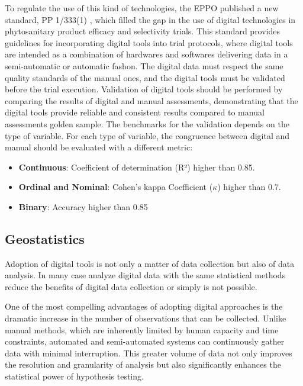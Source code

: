 \documentclass[12pt,a4paper,oneside]{report}
\begin{document}
To regulate the use of this kind of technologies, the EPPO published a new standard, 
PP 1/333(1) \cite{PP13332024}, which 
filled the gap in the use of digital technologies in phytosanitary product efficacy
and selectivity trials. This standard provides guidelines for incorporating digital
tools into trial protocols, where digital tools are intended as a combination of
hardwares and softwares delivering data 
in a semi-automatic or automatic fashon.
The digital data must respect the same quality standards of the manual
ones, and the digital tools must be validated before the trial execution.
Validation of digital tools should
be performed by comparing the results of digital and manual assessments, 
demonstrating that the digital tools provide reliable and consistent
results compared to manual assessments golden sample. 
The benchmarks for the validation depends
on the type of variable. For each type of variable, the congruence between 
digital and manual should be evaluated with a different metric:

\begin{itemize}
    \item \textbf{Continuous}: Coefficient of determination (R²) higher than 0.85.
    \item \textbf{Ordinal and Nominal}: Cohen's kappa Coefficient ($\kappa$) higher than 0.7.
    \item \textbf{Binary}: Accuracy higher than 0.85
\end{itemize}

\subsection{Geostatistics}

Adoption of digital tools is not only a matter of data collection but also of data
analysis. In many case analyze digital data with the same statistical methods
reduce the benefits of digital data collection or simply is not possible. 

One of the most compelling advantages of adopting digital approaches is the
dramatic increase in the number of observations that can be collected. Unlike
manual methods, which are inherently limited by human capacity and time
constraints, automated and semi-automated systems can continuously gather data
with minimal interruption. This greater volume of data not only improves the
resolution and granularity of analysis but also significantly enhances the
statistical power of hypothesis testing.
\end{document}

